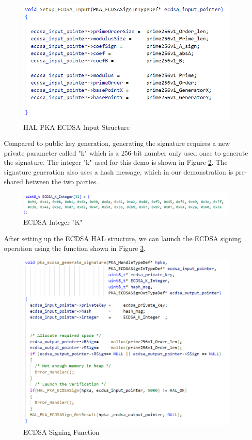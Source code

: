     \begin{figure}[H]
    \centering
    \includegraphics[width=17cm]{img/ecdsa_func.png}
    \caption{HAL PKA ECDSA Input Structure}
    \label{fig:ecdsa func}
    \end{figure}

    Compared to public key generation, generating the signature requires a new private parameter called "k" which is a 256-bit number only used once to generate the signature. The integer "k" used for this demo is shown in Figure \ref{fig:ecdsa_k}. The signature generation also uses a hash message, which in our demonstration is pre-shared between the two parties.
    \begin{figure}[H]
    \centering
    \includegraphics[width=17cm]{img/ecdsa k.png}
    \caption{ECDSA Integer "K"}
    \label{fig:ecdsa_k}
    \end{figure}
    After setting up the ECDSA HAL structure, we can launch the ECDSA signing operation using the function shown in Figure \ref{fig:ecdsa func2}.
    \begin{figure}[H]
    \centering
    \includegraphics[width=17cm]{img/ecdsa func2.png}
    \caption{ECDSA Signing Function}
    \label{fig:ecdsa func2}
    \end{figure}

